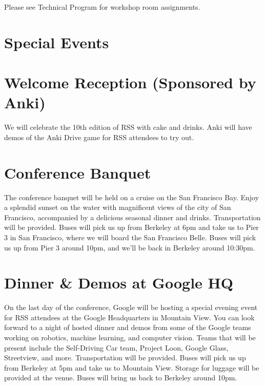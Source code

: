\vspace{0.3cm}
{\Large Please see Technical Program for workshop room assignments.}


\newpage
{} \section{Special Events}

\section*{Welcome Reception (Sponsored by Anki)}

We will celebrate the 10th edition of RSS with cake and drinks. Anki will have demos of the Anki Drive game for RSS attendees to try out.

\vspace{3mm}
\section*{Conference Banquet}
The conference banquet will be held on a cruise on the San Francisco Bay. Enjoy a splendid sunset on the water with magnificent views of the city of San Francisco, accompanied by a delicious seasonal dinner and drinks. Transportation will be provided. Buses will pick us up from Berkeley at 6pm and take us to Pier 3 in San Francisco, where we will board the San Francisco Belle. Buses will pick us up from Pier 3 around 10pm, and we'll be back in Berkeley around 10:30pm.

\vspace{3mm}
\section*{Dinner \& Demos at Google HQ}
On the last day of the conference, Google will be hosting a special evening event for RSS attendees at the Google Headquarters in Mountain View. You can look forward to a night of hosted dinner and demos from some of the Google teams working on robotics, machine learning, and computer vision. Teams that will be present include the Self-Driving Car team, Project Loon, Google Glass, Streetview, and more. Transportation will be provided. Buses will pick us up from Berkeley at 5pm and take us to Mountain View. Storage for luggage will be provided at the venue. Buses will bring us back to Berkeley around 10pm.


\setlength\fboxrule{0pt}



